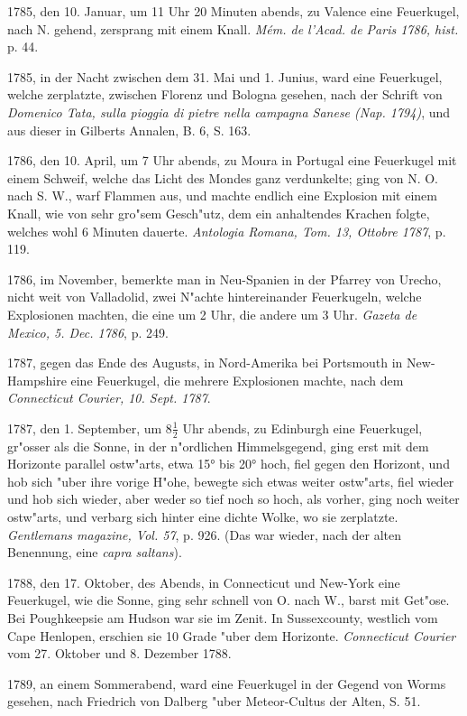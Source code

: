 \documentclass[a4paper, 11pt, oneside, polutonikogreek, german]{article}
\begin{document}
1785, den 10. Januar, um 11 Uhr 20 Minuten abends, zu Valence eine Feuerkugel, nach N. gehend, zersprang mit einem Knall. \emph{Mém. de l'Acad. de Paris 1786, hist.} p. 44.

1785, in der Nacht zwischen dem 31. Mai und 1. Junius, ward eine Feuerkugel, welche zerplatzte, zwischen Florenz und Bologna gesehen, nach der Schrift von \emph{Domenico Tata, sulla pioggia di pietre nella campagna Sanese (Nap. 1794)}, und aus dieser in Gilberts Annalen, B. 6, S. 163.

1786, den 10. April, um 7 Uhr abends, zu Moura in Portugal eine Feuerkugel mit einem Schweif, welche das Licht des Mondes ganz verdunkelte; ging von N. O. nach S. W., warf Flammen aus, und machte endlich eine Explosion mit einem Knall, wie von sehr gro"sem Gesch"utz, dem ein anhaltendes Krachen folgte, welches wohl 6 Minuten dauerte. \emph{Antologia Romana, Tom. 13, Ottobre 1787}, p. 119.

1786, im November, bemerkte man in Neu-Spanien in der Pfarrey von Urecho, nicht weit von Valladolid, zwei N"achte hintereinander Feuerkugeln, welche Explosionen machten, die eine um 2 Uhr, die andere um 3 Uhr. \emph{Gazeta de Mexico, 5. Dec. 1786}, p. 249.

1787, gegen das Ende des Augusts, in Nord-Amerika bei Portsmouth in New-Hampshire eine Feuerkugel, die mehrere Explosionen machte, nach dem \emph{Connecticut Courier, 10. Sept. 1787}.

1787, den 1. September, um $\mathfrak{8\frac{1}{2}}$ Uhr abends, zu Edinburgh eine Feuerkugel, gr"osser als die Sonne, in der n"ordlichen Himmelsgegend, ging erst mit dem Horizonte parallel ostw"arts, etwa 15° bis 20° hoch, fiel gegen den Horizont, und hob sich "uber ihre vorige H"ohe, bewegte sich etwas weiter ostw"arts, fiel wieder und hob sich wieder, aber weder so tief noch so hoch, als vorher, ging noch weiter ostw"arts, und verbarg sich hinter eine dichte Wolke, wo sie zerplatzte. \emph{Gentlemans magazine, Vol. 57}, p. 926. (Das war wieder, nach der alten Benennung, eine \emph{capra saltans}).

1788, den 17. Oktober, des Abends, in Connecticut und New-York eine Feuerkugel, wie die Sonne, ging sehr schnell von O. nach W., barst mit Get"ose. Bei Poughkeepsie am Hudson war sie im Zenit. In Sussexcounty, westlich vom Cape Henlopen, erschien sie 10 Grade "uber dem Horizonte. \emph{Connecticut Courier} vom 27. Oktober und 8. Dezember 1788.

1789, an einem Sommerabend, ward eine Feuerkugel in der Gegend von Worms gesehen, nach Friedrich von Dalberg "uber Meteor-Cultus der Alten, S. 51.
\end{document}
